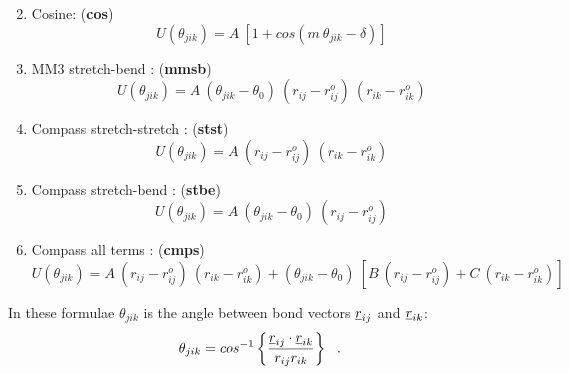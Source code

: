 \begin{enumerate}
\begin{equation}
\end{equation}
\item Cosine:  ({\bf cos})
\begin{equation}
U(\theta_{jik}) = A~[1 + cos(m~\theta_{jik}-\delta)]
\end{equation}
\item MM3 stretch-bend \cite{allinger-89a}:  ({\bf mmsb})
\begin{equation}
U(\theta_{jik}) = A~(\theta_{jik}-\theta_{0})~(r_{ij} - r_{ij}^{o})~(r_{ik} - r_{ik}^{o})
\end{equation}
\item Compass stretch-stretch \cite{sun-98a}:  ({\bf stst})
\begin{equation}
U(\theta_{jik}) = A~(r_{ij} - r_{ij}^{o})~(r_{ik} - r_{ik}^{o})
\end{equation}
\item Compass stretch-bend \cite{sun-98a}:  ({\bf stbe})
\begin{equation}
U(\theta_{jik}) = A~(\theta_{jik}-\theta_{0})~(r_{ij} - r_{ij}^{o})
\end{equation}
\item Compass all terms \cite{sun-98a}:  ({\bf cmps})
\begin{equation}
U(\theta_{jik}) = A~(r_{ij} - r_{ij}^{o})~(r_{ik} - r_{ik}^{o}) +
(\theta_{jik}-\theta_{0})~[B~(r_{ij} - r_{ij}^{o})+C~(r_{ik} - r_{ik}^{o})]
\end{equation}
\end{enumerate}
In these formulae $\theta_{jik}$ is the angle between bond vectors
$\mbox{$\underline{r}$}_{ij}$ and $\mbox{$\underline{r}$}_{ik}$:
\begin{equation}
\theta_{jik}=cos^{-1}\left\{\frac{\mbox{$\underline{r}$}_{ij}\cdot\mbox{$\underline{r}$}_{ik}}
{r_{ij}r_{ik}}\right\}~~.
\end{equation}

